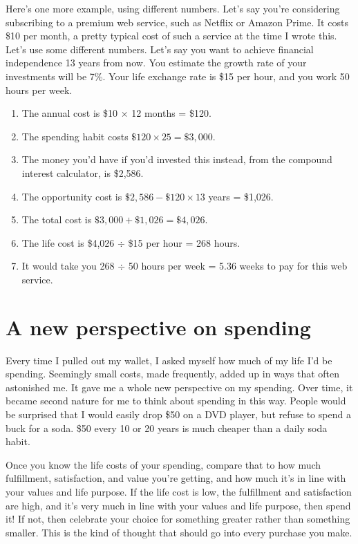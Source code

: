 Here's one more example, using different numbers. Let's say you're considering subscribing to a premium web service, such as Netflix or Amazon Prime. It costs \$10 per month, a pretty typical cost of such a service at the time I wrote this. Let's use some different numbers. Let's say you want to achieve financial independence 13 years from now. You estimate the growth rate of your investments will be 7\%. Your life exchange rate is \$15 per hour, and you work 50 hours per week.

\begin{enumerate}
\item The annual cost is \$10 $\times$ 12 months = \$120.
\item The spending habit costs $\$120 \times 25 = \$3,000$.
\item The money you'd have if you'd invested this instead, from the compound interest calculator, is \$2,586.
\item The opportunity cost is $\$2,586 - \$120 \times 13$ years = \$1,026.
\item The total cost is $\$3,000 + \$1,026 = \$4,026$.
\item The life cost is \$4,026 $\div$ \$15 per hour = 268 hours.
\item It would take you 268 $\div$ 50 hours per week = 5.36 weeks to pay for this web service.
\end{enumerate}

\section{A new perspective on spending}
Every time I pulled out my wallet, I asked myself how much of my life I'd be spending. Seemingly small costs, made frequently, added up in ways that often astonished me. It gave me a whole new perspective on my spending. Over time, it became second nature for me to think about spending in this way. People would be surprised that I would easily drop \$50 on a DVD player, but refuse to spend a buck for a soda. \$50 every 10 or 20 years is much cheaper than a daily soda habit.

Once you know the life costs of your spending, compare that to how much fulfillment, satisfaction, and value you're getting, and how much it's in line with your values and life purpose. If the life cost is low, the fulfillment and satisfaction are high, and it's very much in line with your values and life purpose, then spend it! If not, then celebrate your choice for something greater rather than something smaller. This is the kind of thought that should go into every purchase you make.

